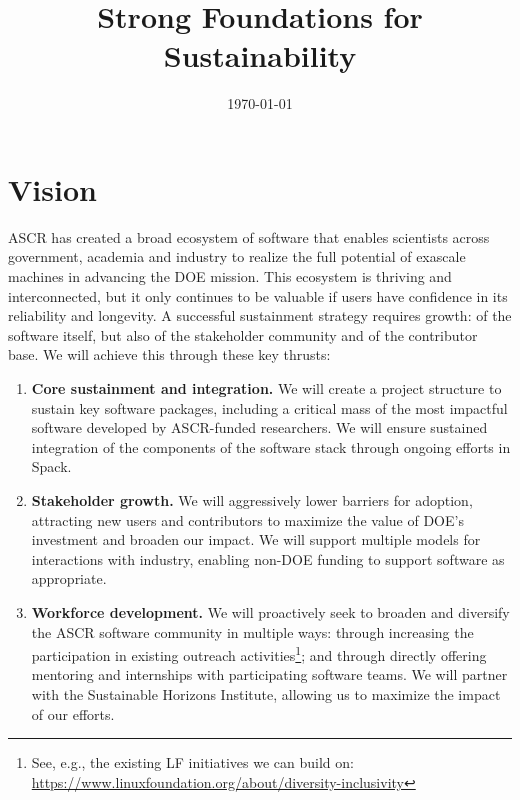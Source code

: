 \documentclass[11pt]{article}
\title{\vspace{-3em}\sf\huge\color{secblue}%
Strong Foundations for Sustainability}
\date{\vspace{-4em}\today\vspace{-3em}}
\begin{document}
\setcounter{page}{1}

\maketitle

\section{Vision}

ASCR has created a broad ecosystem of software that
enables scientists across government, academia and industry to realize the full
potential of exascale machines in advancing the DOE mission.
This ecosystem is thriving and interconnected,
but it only continues to be
valuable if users have confidence in its reliability and longevity.
A successful sustainment strategy requires growth: of the software itself,
but also of the stakeholder community and of the contributor base.
We will achieve this through these key thrusts:

\begin{enumerate}

\item {\bf Core sustainment and integration.} We will create a project structure to sustain key
    software packages, including a critical mass of the most impactful software developed
    by ASCR-funded researchers.  We will ensure sustained integration of the components of the
    software stack through ongoing efforts in Spack.

\item {\bf Stakeholder growth.} We will aggressively lower barriers for adoption, attracting new
    users and contributors to maximize the value of DOE's investment and broaden our
    impact.  We will support multiple models for interactions with industry,
    enabling non-DOE funding to support software as appropriate.

\item {\bf Workforce development.} We will proactively seek to broaden and diversify the
    ASCR software community in multiple ways: through increasing the participation in
    existing outreach activities\footnote{See, e.g., the existing LF initiatives we can build on:
  \href{https://www.linuxfoundation.org/about/diversity-inclusivity}{https://www.linuxfoundation.org/about/diversity-inclusivity}};
    and through directly offering
    mentoring and internships with participating software teams.  We will partner with the
    Sustainable Horizons Institute, allowing us to maximize the impact of our efforts.
\end{enumerate}
\end{document}
